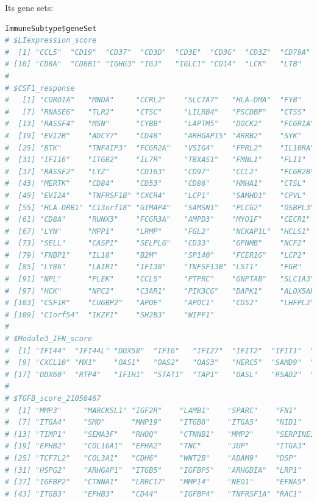 \documentclass[
  12pt,
]{book}
\begin{document}
Its gene sets:

\begin{lstlisting}[language=R]
ImmuneSubtype$geneSet
# $LIexpression_score
#  [1] "CCL5"  "CD19"  "CD37"  "CD3D"  "CD3E"  "CD3G"  "CD3Z"  "CD79A" "CD79B"
# [10] "CD8A"  "CD8B1" "IGHG3" "IGJ"   "IGLC1" "CD14"  "LCK"   "LTB"   "MS4A1"
# 
# $CSF1_response
#   [1] "CORO1A"   "MNDA"     "CCRL2"    "SLC7A7"   "HLA-DMA"  "FYB"     
#   [7] "RNASE6"   "TLR2"     "CTSC"     "LILRB4"   "PSCDBP"   "CTSS"    
#  [13] "RASSF4"   "MSN"      "CYBB"     "LAPTM5"   "DOCK2"    "FCGR1A"  
#  [19] "EVI2B"    "ADCY7"    "CD48"     "ARHGAP15" "ARRB2"    "SYK"     
#  [25] "BTK"      "TNFAIP3"  "FCGR2A"   "VSIG4"    "FPRL2"    "IL10RA"  
#  [31] "IFI16"    "ITGB2"    "IL7R"     "TBXAS1"   "FMNL1"    "FLI1"    
#  [37] "RASSF2"   "LYZ"      "CD163"    "CD97"     "CCL2"     "FCGR2B"  
#  [43] "MERTK"    "CD84"     "CD53"     "CD86"     "HMHA1"    "CTSL"    
#  [49] "EVI2A"    "TNFRSF1B" "CXCR4"    "LCP1"     "SAMHD1"   "CPVL"    
#  [55] "HLA-DRB1" "C13orf18" "GIMAP4"   "SAMSN1"   "PLCG2"    "OSBPL3"  
#  [61] "CD8A"     "RUNX3"    "FCGR3A"   "AMPD3"    "MYO1F"    "CECR1"   
#  [67] "LYN"      "MPP1"     "LRMP"     "FGL2"     "NCKAP1L"  "HCLS1"   
#  [73] "SELL"     "CASP1"    "SELPLG"   "CD33"     "GPNMB"    "NCF2"    
#  [79] "FNBP1"    "IL18"     "B2M"      "SP140"    "FCER1G"   "LCP2"    
#  [85] "LY86"     "LAIR1"    "IFI30"    "TNFSF13B" "LST1"     "FGR"     
#  [91] "NPL"      "PLEK"     "CCL5"     "PTPRC"    "GNPTAB"   "SLC1A3"  
#  [97] "HCK"      "NPC2"     "C3AR1"    "PIK3CG"   "DAPK1"    "ALOX5AP" 
# [103] "CSF1R"    "CUGBP2"   "APOE"     "APOC1"    "CD52"     "LHFPL2"  
# [109] "C1orf54"  "IKZF1"    "SH2B3"    "WIPF1"   
# 
# $Module3_IFN_score
#  [1] "IFI44"  "IFI44L" "DDX58"  "IFI6"   "IFI27"  "IFIT2"  "IFIT1"  "IFIT3" 
#  [9] "CXCL10" "MX1"    "OAS1"   "OAS2"   "OAS3"   "HERC5"  "SAMD9"  "HERC6" 
# [17] "DDX60"  "RTP4"   "IFIH1"  "STAT1"  "TAP1"   "OASL"   "RSAD2"  "ISG15" 
# 
# $TGFB_score_21050467
#  [1] "MMP3"     "MARCKSL1" "IGF2R"    "LAMB1"    "SPARC"    "FN1"     
#  [7] "ITGA4"    "SMO"      "MMP19"    "ITGB8"    "ITGA5"    "NID1"    
# [13] "TIMP1"    "SEMA3F"   "RHOQ"     "CTNNB1"   "MMP2"     "SERPINE1"
# [19] "EPHB2"    "COL16A1"  "EPHA2"    "TNC"      "JUP"      "ITGA3"   
# [25] "TCF7L2"   "COL3A1"   "CDH6"     "WNT2B"    "ADAM9"    "DSP"     
# [31] "HSPG2"    "ARHGAP1"  "ITGB5"    "IGFBP5"   "ARHGDIA"  "LRP1"    
# [37] "IGFBP2"   "CTNNA1"   "LRRC17"   "MMP14"    "NEO1"     "EFNA5"   
# [43] "ITGB3"    "EPHB3"    "CD44"     "IGFBP4"   "TNFRSF1A" "RAC1"    

\end{lstlisting}
\end{document}
